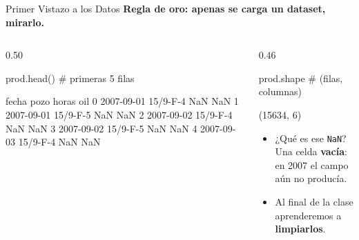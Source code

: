 \documentclass[aspectratio=169, 11pt]{beamer}
\begin{document}
\begin{frame}[fragile,shrink=15]{Primer Vistazo a los Datos}
  \vspace{-4pt}
  {\small\color{arcaDark}\bfseries
    Regla de oro: apenas se carga un dataset, \textbf{mirarlo}.}

  \vspace{4pt}
  \begin{columns}[T]
    \begin{column}{0.50\textwidth}
      \begin{pyblock}
prod.head()   # primeras 5 filas
      \end{pyblock}
      \vspace{2pt}
      \begin{outputblock}
       fecha      pozo  horas  oil
0 2007-09-01  15/9-F-4    NaN  NaN
1 2007-09-01  15/9-F-5    NaN  NaN
2 2007-09-02  15/9-F-4    NaN  NaN
3 2007-09-02  15/9-F-5    NaN  NaN
4 2007-09-03  15/9-F-4    NaN  NaN
      \end{outputblock}
    \end{column}

    \begin{column}{0.46\textwidth}
      \begin{pyblock}
prod.shape    # (filas, columnas)
      \end{pyblock}
      \vspace{2pt}
      \begin{outputblock}
(15634, 6)
      \end{outputblock}

      \vspace{4pt}
      {\scriptsize\color{textMuted}
      \begin{itemize}\setlength{\itemsep}{4pt}
        \item[{\color{arcaRed}\scriptsize\faQuestionCircle}]
          ¿Qué es ese \texttt{NaN}? Una celda
          \textbf{vacía}: en 2007 el campo aún
          no producía.
        \item[{\color{arcaRed}\scriptsize\faArrowRight}]
          Al final de la clase aprenderemos
          a \textbf{limpiarlos}.
      \end{itemize}
      }
    \end{column}
  \end{columns}
\end{frame}
\end{document}

